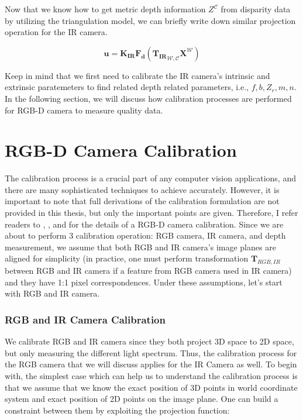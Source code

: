 \documentclass[a4paper]{report}
\numberwithin{figure}{section}
\begin{document}
Now that we know how to get metric depth information $Z^{\mathcal{C}}$ from 
disparity data 
by utilizing the triangulation model, we can briefly write down similar 
projection operation for the IR camera.

\begin{equation}\label{eq:ir_cam_proj_func}
  \mathbf{u} 
  =
  \mathbf{K_{IR}} \mathbf{F_d} ({\mathbf{T_{IR}}}_{\mathcal{W}, \mathcal{C}}  
  \mathbf{X^{\mathcal{W}}})
\end{equation} 


Keep in mind that we first need to calibrate the IR camera's intrinsic and 
extrinsic paratemeters to find related depth related parameters, i.e., 
$f,b,Z_r,m, n$. In the following section, we will discuss how calibration 
processes are performed for RGB-D camera to measure quality data.

\section{RGB-D Camera Calibration} \label{sb_sc_rgb_calibration}

The calibration process is a crucial part of any computer vision applications, 
and there are many sophisticated techniques to achieve accurately.  However, 
it is important to note that full derivations of the calibration formulation 
are not provided in this thesis, but only the important points are given.  
Therefore, I refer readers to \parencite{Zhang2000a}, \parencite{Smisek2011}, 
\parencite{Karan2015} and \parencite{Herrera2016a} for the details of a RGB-D 
camera 
calibration.  Since we are about to perform 3 calibration operation: RGB 
camera, IR camera, and depth measurement, we assume that both RGB and IR 
camera's image planes are aligned for simplicity (in practice, one must 
  perform transformation $\mathbf{T}_{RGB,IR}$ between RGB 
and IR camera if a feature from RGB camera used in IR camera) and they have 
1:1 pixel correspondences. Under these assumptions, let's start with RGB and 
IR camera.

\subsubsection{RGB and IR Camera Calibration}

We calibrate RGB and IR camera since they both project 3D space to 2D space, 
but only measuring the different light spectrum. Thus, the calibration process 
for the RGB camera that we will discuss applies for the IR Camera as well.  To 
begin with, the simplest case which can help us to understand the calibration 
process is that we assume that we know the exact position of 3D points in 
world coordinate system and exact position of 2D points on the image plane.  
One can build a constraint between them by exploiting the projection function:
\end{document}
